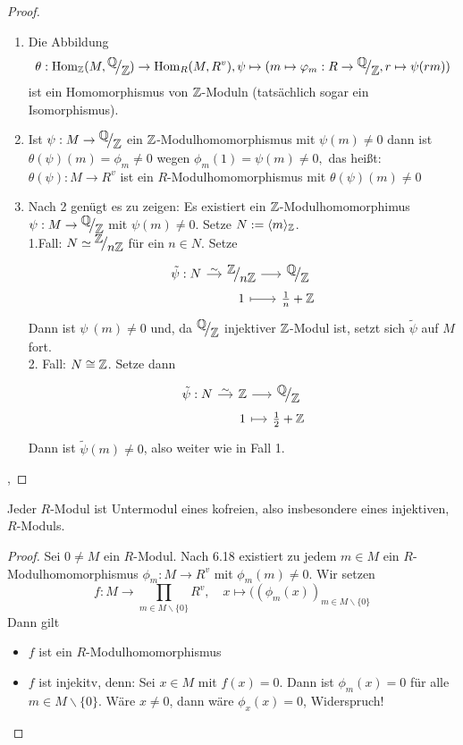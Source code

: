 \begin{proof}
	\begin{enumerate}
		\item Die Abbildung $$\theta: \Hom_{\Z}(M ,\QR{\Q}{\Z}) \to \Hom_{R}(M, R^{v}), \psi \mapsto (m \mapsto \phi_m: R \to \QR{\Q}{\Z}, r \mapsto \psi(rm))$$
		ist ein Homomorphismus von $\mathbb{Z}$-Moduln (tatsächlich sogar ein Isomorphismus).
		\item Ist $\psi: M \to \QR{\Q}{\Z} $ ein $\mathbb{Z}$-Modulhomomorphismus mit $ \psi(m) \neq 0$ dann ist $\theta(\psi)(m) = \phi_m \neq 0$ wegen $\phi_m(1)= \psi(m) \neq 0, $ das heißt: $\theta(\psi): M \to R^{v} $ ist ein $R$-Modulhomomorphismus mit $\theta(\psi)(m) \neq 0$
		\item Nach 2 genügt es zu zeigen: Es existiert ein $\mathbb{Z}$-Modulhomomorphimus $\psi: M \to \QR{\Q}{\Z} $ mit $ \psi(m) \neq 0. $ Setze $N := \langle m\rangle_{\mathbb{Z}}$. \\
		1.Fall: $N \simeq \QR{\Z}{n\Z} $ für ein $n \in N $. Setze
		$$\begin{tikzcd}[column sep = small, row sep = 0.1 ex]
		\tilde{\psi}: N \arrow{r}{\sim} & \QR{\Z}{n \Z} \arrow{r} & \QR{\Q}{\Z} \\
		& 1 \arrow[mapsto]{r} & \frac{1}{n} + \Z
		\end{tikzcd}$$
		 Dann ist $\psi^{~}(m)\neq 0 $ und, da $\QR{\Q}{\Z} $ injektiver $\mathbb{Z}$-Modul ist, setzt sich $\tilde{\psi} $ auf $M$ fort.\\
		2. Fall: $N \cong \mathbb{Z}$. Setze dann 
		$$\begin{tikzcd}[column sep = small, row sep = 0.1 ex]
		\tilde{\psi}: N \arrow{r}{\sim} & \Z \arrow{r} & \QR{\Q}{\Z} \\
		& 1 \arrow[mapsto]{r} & \frac{1}{2} + \Z
		\end{tikzcd}$$
		Dann ist $\tilde{\psi} (m) \neq 0$, also weiter wie in Fall 1.
	\end{enumerate}, 
\end{proof}
\begin{sa}
	Jeder $R$-Modul ist Untermodul eines kofreien, also insbesondere eines injektiven, $R$-Moduls.
\end{sa}
\begin{proof}
	Sei $0\neq M$ ein $R$-Modul. Nach 6.18 existiert zu jedem $m\in M$ ein $R$-Modulhomomorphismus $\phi_m:M \to R^v$ mit $\phi_m(m) \neq 0$. Wir setzen
	$$f:M \longrightarrow \prod_{m\in M\backslash \{0\}} R^v, \quad x \mapsto ((\phi_m(x))_{m\in M \backslash \{0\}}$$
	Dann gilt
	\begin{itemize}
		\item $f$ ist ein $R$-Modulhomomorphismus
		\item $f$ ist injekitv, denn: Sei $x\in M$ mit $f(x) = 0$. Dann ist $\phi_m(x) = 0$ für alle $m\in M\backslash \{0\}$. Wäre $x\neq 0$, dann wäre $\phi_x(x) = 0$, Widerspruch!
	\end{itemize}
\end{proof}
